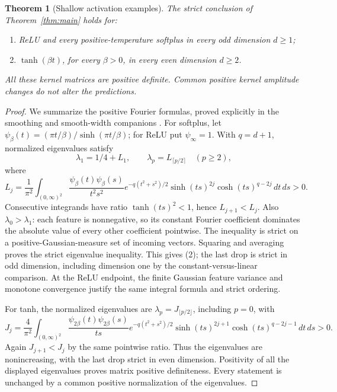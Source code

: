 \documentclass[11pt]{article}
\newtheorem{theorem}{Theorem}\newtheorem{lemma}[theorem]{Lemma}
\begin{document}
\begin{theorem}[Shallow activation examples]\label{thm:activations}
The strict conclusion of Theorem~\ref{thm:main} holds for:
\begin{enumerate}
\item ReLU and every positive-temperature softplus in every odd
      dimension $d\ge1$;
\item $\tanh(\beta t)$, for every $\beta>0$, in every even dimension
      $d\ge2$.
\end{enumerate}
All these kernel matrices are positive definite. Common positive kernel
amplitude changes do not alter the predictions.
\end{theorem}
\begin{proof}
We summarize the positive Fourier formulas, proved explicitly in the
smoothing and smooth-width companions \cite{smoothing,smooth}.
For softplus, let
$\psi_\beta(t)=(\pi t/\beta)/\sinh(\pi t/\beta)$;
for ReLU put $\psi_\infty=1$.
With $q=d+1$, normalized eigenvalues satisfy
\[
 \lambda_1=1/4+L_1,\qquad
 \lambda_p=L_{\lceil p/2\rceil}\quad(p\ge2),
\]
where
\[
 L_j=\frac1{\pi^2}\int_{(0,\infty)^2}
 \frac{\psi_\beta(t)\psi_\beta(s)}{t^2s^2}
 e^{-q(t^2+s^2)/2}\sinh(ts)^{2j}\cosh(ts)^{q-2j}\,dt\,ds>0.
                                                               \tag{6}
\]
Consecutive integrands have ratio $\tanh(ts)^2<1$, hence
$L_{j+1}<L_j$. Also $\lambda_0>\lambda_1$: each feature is
nonnegative, so its constant Fourier coefficient dominates the absolute
value of every other coefficient pointwise. The inequality is strict
on a positive-Gaussian-measure set of incoming vectors. Squaring and
averaging proves the strict eigenvalue inequality.
This gives (2); the last drop is strict in odd dimension, including
dimension one by the constant-versus-linear comparison.
At the ReLU endpoint, the finite Gaussian feature variance and monotone
convergence justify the same integral formula and strict ordering.

For tanh, the normalized eigenvalues are
$\lambda_p=J_{\lfloor p/2\rfloor}$, including $p=0$, with
\[
 J_j=\frac4{\pi^2}\int_{(0,\infty)^2}
 \frac{\psi_{2\beta}(t)\psi_{2\beta}(s)}{ts}
 e^{-q(t^2+s^2)/2}\sinh(ts)^{2j+1}
                         \cosh(ts)^{q-2j-1}\,dt\,ds>0.        \tag{7}
\]
Again $J_{j+1}<J_j$ by the same pointwise ratio. Thus the eigenvalues
are nonincreasing, with the last drop strict in even dimension.
Positivity of all the displayed eigenvalues proves matrix positive
definiteness. Every statement is unchanged by a common positive
normalization of the eigenvalues.
\end{proof}
\end{document}
